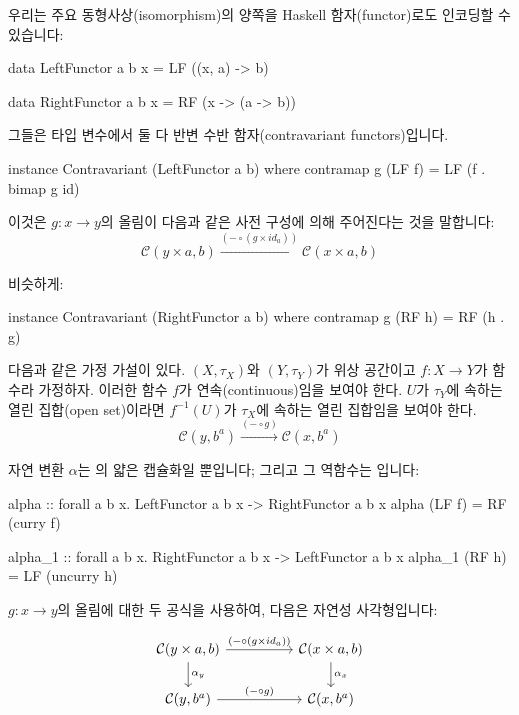 \documentclass[DaoFP]{subfiles}
\begin{document}
우리는 주요 동형사상(isomorphism)의 양쪽을 Haskell 함자(functor)로도 인코딩할 수 있습니다:
\begin{haskell}
data LeftFunctor  a b x = LF ((x, a) -> b)
\end{haskell}
\begin{haskell}
data RightFunctor a b x = RF (x -> (a -> b))
\end{haskell}
그들은  타입 변수에서 둘 다 반변 수반 함자(contravariant functors)입니다.
\begin{haskell}
instance Contravariant (LeftFunctor a b) where
  contramap g (LF f) = LF (f . bimap g id)
\end{haskell}
이것은 $g \colon x \to y$의 올림이 다음과 같은 사전 구성에 의해 주어진다는 것을 말합니다:
\[ \mathcal{C}(y \times a, b) \xrightarrow{(- \circ (g \times id_a)) }  \mathcal{C}(x \times a, b)\]

비슷하게:
\begin{haskell}
instance Contravariant (RightFunctor a b) where
  contramap g (RF h) = RF (h . g)
\end{haskell}
다음과 같은 가정 가설이 있다. $(X, \tau_X)$와 $(Y, \tau_Y)$가 위상 공간이고 $f: X \to Y$가 함수라 가정하자.
이러한 함수 $f$가 연속(continuous)임을 보여야 한다.
$U$가 $\tau_Y$에 속하는 열린 집합(open set)이라면 $f^{-1}(U)$가 $\tau_X$에 속하는 열린 집합임을 보여야 한다.
\[  \mathcal{C}(y, b^a) \xrightarrow{ (- \circ g) } \mathcal{C}(x, b^a) \]

자연 변환 $\alpha$는 의 얇은 캡슐화일 뿐입니다; 그리고 그 역함수는 입니다:

\begin{haskell}
alpha :: forall a b x. LeftFunctor a b x -> RightFunctor a b x
alpha (LF f) = RF (curry f)
\end{haskell}

\begin{haskell}
alpha_1 :: forall a b x. RightFunctor a b x -> LeftFunctor a b x
alpha_1 (RF h) = LF (uncurry h)
\end{haskell}

$g \colon x \to y$의 올림에 대한 두 공식을 사용하여, 다음은 자연성 사각형입니다:

\[
 \begin{tikzcd}
 \mathcal{C}(y \times a, b)
 \arrow[rr, "(- \circ (g \times id_a))"]
 \arrow[d,  "\alpha_y"]
& &
\mathcal{C}(x \times a, b)
  \arrow[d, "\alpha_x"]
 \\
 \mathcal{C}(y, b^a)
 \arrow[rr, "(- \circ g)"]
& &
\mathcal{C}(x, b^a)
 \end{tikzcd}
\]
\end{document}
